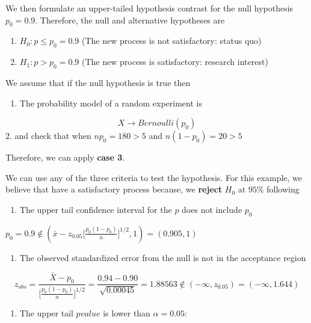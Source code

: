 \documentclass[
]{book}
\providecommand{\tightlist}{%
  \setlength{\itemsep}{0pt}\setlength{\parskip}{0pt}}
\begin{document}
We then formulate an upper-tailed hypothesis contrast for the null hypothesis \(p_0=0.9\). Therefore, the null and alternative hypotheses are

\begin{enumerate}
\def\labelenumi{\alph{enumi}.}
\tightlist
\item
  \(H_0: p \leq p_0=0.9\) (The new process is not satisfactory: status quo)
\item
  \(H_1: p> p_0=0.9\) (The new process is satisfactory: research interest)
\end{enumerate}

We assume that if the null hypothesis is true then

\begin{enumerate}
\def\labelenumi{\arabic{enumi}.}
\tightlist
\item
  The probability model of a random experiment is
\end{enumerate}

\[X \rightarrow Bernoulli (p_0)\]
2. and check that when \(np_0=180>5\) and \(n(1-p_0)=20>5\)

Therefore, we can apply \textbf{case 3}.

We can use any of the three criteria to test the hypothesis. For this example, we believe that have a satisfactory process because, we \textbf{reject} \(H_0\) at \(95\%\) following

\begin{enumerate}
\def\labelenumi{\arabic{enumi}.}
\tightlist
\item
  The upper tail confidence interval for the \(p\) does not include \(p_0\)
\end{enumerate}

\(p_0=0.9 \notin (\bar{x}-z_{0.05}\big[\frac{p_0(1-p_0)}{n} \big]^{1/2},1)= (0.905,1)\)

\begin{enumerate}
\def\labelenumi{\arabic{enumi}.}
\setcounter{enumi}{1}
\tightlist
\item
  The observed standardized error from the null is not in the acceptance region
\end{enumerate}

\[z_{obs}= \frac{\bar{X}-p_0}{\big[\frac{p_0(1-p_0)}{n} \big]^{1/2}} =\frac{0.94-0.90}{\sqrt{0.00045}}=1.88563 \notin (-\infty, z_{0.05})=(-\infty, 1.644)\]

\begin{enumerate}
\def\labelenumi{\arabic{enumi}.}
\setcounter{enumi}{2}
\tightlist
\item
  The upper tail \(pvalue\) is lower than \(\alpha=0.05\):
\end{enumerate}
\end{document}
